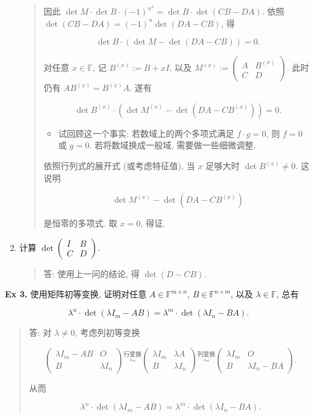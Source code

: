 \documentclass[
]{ctexart}
\begin{document}
\begin{enumerate}
\begin{quote}
  因此 \(\det M\cdot \det B\cdot (-1)^{n^2}=\det B\cdot \det (CB-DA)\).
  依照 \(\det (CB-DA)=(-1)^{n}\det (DA-CB)\), 得

  \[\det B\cdot (\det M-\det (DA-CB))=0.\]

  对任意 \(x\in \mathbb F\), 记 \(B^{(x)}:= B+xI\), 以及
  \(M^{(x)}:=\begin{pmatrix}A&B^{(x)}\\C&D\end{pmatrix}\). 此时仍有
  \(AB^{(x)}=B^{(x)}A\). 遂有

  \[\det B^{(x)}\cdot (\det M^{(x)}-\det (DA-CB^{(x)}))=0.\]

  \begin{itemize}
  \item
    试回顾这一个事实: 若数域上的两个多项式满足 \(f\cdot g=0\), 则
    \(f=0\) 或 \(g=0\). 若将数域换成一般域, 需要做一些细微调整.
  \end{itemize}

  依照行列式的展开式 (或考虑特征值), 当 \(x\) 足够大时
  \(\det B^{(x)}\neq 0\). 这说明

  \[\det M^{(x)}-\det (DA-CB^{(x)})\]

  是恒零的多项式. 取 \(x=0\), 得证.
  \end{quote}
\item
  计算 \(\det \begin{pmatrix}I&B\\C&D\end{pmatrix}\).

  \begin{quote}
  答: 使用上一问的结论, 得 \(\det (D-CB)\).
  \end{quote}
\end{enumerate}

\textbf{Ex 3.} 使用矩阵初等变换, 证明对任意
\(A\in \mathbb F^{m\times n}\), \(B\in \mathbb F^{n\times m}\), 以及
\(\lambda\in \mathbb F\), 总有

\[\lambda^n\cdot \det (\lambda I_m-AB)=\lambda^m\cdot \det (\lambda I_n-BA).\]

\begin{quote}
答: 对 \(\lambda\neq 0\), 考虑列初等变换

\[\begin{pmatrix}\lambda I_m-AB&O\\B&\lambda I_n\end{pmatrix}\overset{\text{行变换}}\sim \begin{pmatrix}\lambda I_m&\lambda A\\B&\lambda I_n\end{pmatrix}\overset{\text{列变换}}\sim  \begin{pmatrix}\lambda I_m&O\\B&\lambda I_n- BA\end{pmatrix}.\]

从而

\[\lambda^n\cdot \det (\lambda I_m-AB)=\lambda^m\cdot \det (\lambda I_n-BA).\]
\end{quote}
\end{document}
